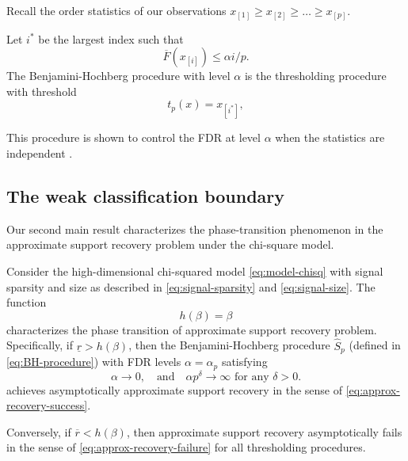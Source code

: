 Recall the order statistics of our observations $x_{[1]} \ge x_{[2]}  \ge \ldots \ge x_{[p]}$.

\begin{definition}
Let $i^*$ be the largest index such that
$$
\overline{F}(x_{[i]}) \le \alpha i/p.
$$
The Benjamini-Hochberg procedure with level $\alpha$ is the thresholding procedure with threshold
\begin{equation} \label{eq:BH-procedure}
    t_p(x) = x_{[i^*]},
\end{equation}
\end{definition}

This procedure is shown to control the FDR at level $\alpha$ when the statistics are
independent \cite{benjamini1995controlling}.

\subsection{The weak classification boundary}
\label{subsec:weak-classification-boundary}

Our second main result characterizes the phase-transition phenomenon in the approximate support recovery problem under the chi-square model.

\begin{theorem} \label{thm:chi-squred-weak-boundary}
Consider the high-dimensional chi-squared model \eqref{eq:model-chisq} with signal sparsity and size as described in \eqref{eq:signal-sparsity} and \eqref{eq:signal-size}.
The function 
\begin{equation} \label{eq:weak-classification-boundary-chisquared}
    h(\beta) = \beta
\end{equation}
characterizes the phase transition of approximate support recovery problem.
Specifically, if $\underline{r} > {h}(\beta)$, then the Benjamini-Hochberg procedure $\widehat{S}_p$ (defined in \eqref{eq:BH-procedure}) with FDR levels $\alpha=\alpha_p$ satisfying
\begin{equation} \label{eq:FDR-rate-to-zero}
    \alpha\to 0,\quad \text{and} \quad \alpha p^\delta\to\infty \text{  for any } \delta>0.
\end{equation}
achieves asymptotically approximate support recovery in the sense of \eqref{eq:approx-recovery-success}. 

Conversely, if $\overline{r} < {h}(\beta)$, then approximate support recovery asymptotically fails in the sense of \eqref{eq:approx-recovery-failure} for all thresholding procedures.
\end{theorem}

